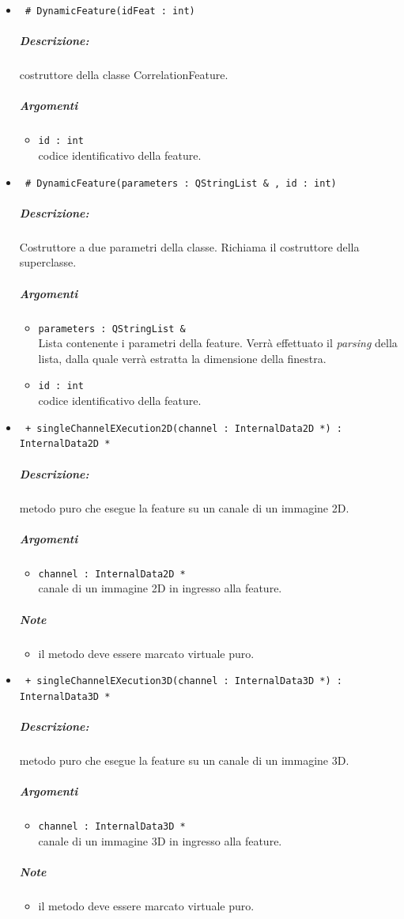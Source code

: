 	\begin{itemize}
	\item \color{blue}\verb! # DynamicFeature(idFeat : int)!
		\color{black}
		\subparagraph{Descrizione:} costruttore della classe CorrelationFeature.
		\subparagraph{Argomenti}
			\begin{itemize}
				\item \color{RoyalPurple} \verb!id : int! \\ 
				\color{black} codice identificativo della feature\g{}.	
			\end{itemize}
			
	\item \color{blue}\verb! # DynamicFeature(parameters : QStringList & , id : int)!
		\color{black}
		\subparagraph{Descrizione:} Costruttore a due parametri della classe. Richiama il costruttore della 						superclasse.
		\subparagraph{Argomenti}
			\begin{itemize}	
				\item \color{RoyalPurple} \verb!parameters : QStringList &! \\ 
				\color{black} Lista contenente i parametri della feature\g{}. Verrà effettuato il \textit{parsing} 						della lista, dalla quale verrà estratta la dimensione della finestra.
				\item \color{RoyalPurple} \verb!id : int! \\ 
				\color{black} codice identificativo della feature\g{}.	
			\end{itemize}

	\item \color{blue}\verb! + singleChannelEXecution2D(channel : InternalData2D *) : InternalData2D *!
		\color{black}
		\subparagraph{Descrizione:} metodo puro che esegue la feature su un canale di un immagine 2D.
		\subparagraph{Argomenti}
			\begin{itemize}
				\item \color{RoyalPurple} \verb!channel : InternalData2D * ! \\ 
				\color{black} canale di un immagine 2D in ingresso alla feature.		
			\end{itemize}
		\subparagraph{Note}
			\begin{itemize}
				\item il metodo deve essere marcato virtuale puro.
			\end{itemize}
			
	\item \color{blue}\verb! + singleChannelEXecution3D(channel : InternalData3D *) : InternalData3D *!
		\color{black}
		\subparagraph{Descrizione:} metodo puro che esegue la feature su un canale di un immagine 3D.
		\subparagraph{Argomenti}
			\begin{itemize}
				\item \color{RoyalPurple} \verb!channel : InternalData3D * ! \\ 
				\color{black} canale di un immagine 3D in ingresso alla feature.		
			\end{itemize}
		\subparagraph{Note}
			\begin{itemize}
				\item il metodo deve essere marcato virtuale puro.
			\end{itemize}
			

\end{itemize}
